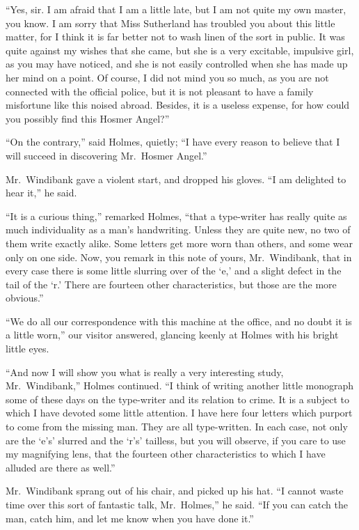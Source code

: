 “Yes, sir. I am afraid that I am a little late, but I am not
quite my own master, you know. I am sorry that Miss
Sutherland has troubled you about this little matter, for I
think it is far better not to wash linen of the sort in public.
It was quite against my wishes that she came, but she is a
very excitable, impulsive girl, as you may have noticed, and
she is not easily controlled when she has made up her mind
on a point. Of course, I did not mind you so much, as you
are not connected with the official police, but it is not pleasant
to have a family misfortune like this noised abroad. Besides,
it is a useless expense, for how could you possibly find
this Hosmer Angel?”

“On the contrary,” said Holmes, quietly; “I have every
reason to believe that I will succeed in discovering Mr.~Hosmer
Angel.”

Mr.~Windibank gave a violent start, and dropped his gloves.
“I am delighted to hear it,” he said.

“It is a curious thing,” remarked Holmes, “that a type-writer
has really quite as much individuality as a man’s
handwriting. Unless they are quite new, no two of them
write exactly alike. Some letters get more worn than others,
and some wear only on one side. Now, you remark in this
note of yours, Mr.~Windibank, that in every case there is some
little slurring over of the ‘e,’ and a slight defect in the tail of
the ‘r.’ There are fourteen other characteristics, but those
are the more obvious.”

“We do all our correspondence with this machine at the
office, and no doubt it is a little worn,” our visitor answered,
glancing keenly at Holmes with his bright little eyes.

“And now I will show you what is really a very interesting
study, Mr.~Windibank,” Holmes continued. “I think of writing
another little monograph some of these days on the type-writer
and its relation to crime. It is a subject to which I
have devoted some little attention. I have here four letters
which purport to come from the missing man. They are all
type-written. In each case, not only are the ‘e’s’ slurred and
the ‘r’s’ tailless, but you will observe, if you care to use my
magnifying lens, that the fourteen other characteristics to
which I have alluded are there as well.”

Mr.~Windibank sprang out of his chair, and picked up his
hat. “I cannot waste time over this sort of fantastic talk,
Mr.~Holmes,” he said. “If you can catch the man, catch
him, and let me know when you have done it.”

